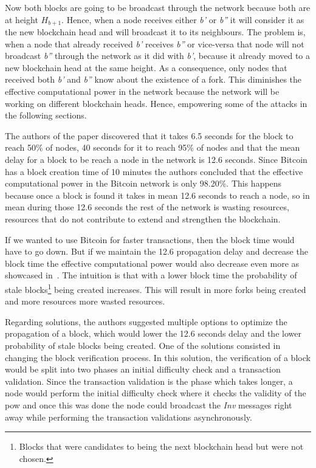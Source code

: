 Now both blocks are going to be broadcast through the network because both are at height $H_{b+1}$. Hence, when a node receives either \textit{b'} or \textit{b''} it will consider it as the new blockchain head and will broadcast it to its neighbours. The problem is, when a node that already received \textit{b'} receives \textit{b''} or vice-versa that node will not broadcast \textit{b''} through the network as it did with \textit{b'}, because it already moved to a new blockchain head at the same height. As a consequence, only nodes that received both \textit{b'} and \textit{b''} know about the existence of a fork. This diminishes the effective computational power in the network because the network will be working on different blockchain heads. Hence, empowering some of the attacks in the following sections.

The authors of the paper discovered that it takes 6.5 seconds for the block to reach 50\% of nodes, 40 seconds for it to reach 95\% of nodes and that the mean delay for a block to be reach a node in the network is 12.6 seconds. Since Bitcoin has a block creation time of 10 minutes the authors concluded that the effective computational power in the Bitcoin network is only 98.20\%. This happens because once a block is found it takes in mean 12.6 seconds to reach a node, so in mean during those 12.6 seconds the rest of the network is wasting resources, resources that do not contribute to extend and strengthen the blockchain.

If we wanted to use Bitcoin for faster transactions, then the block time would have to go down. But if we maintain the 12.6 propagation delay and decrease the block time the effective computational power would also decrease even more as showcased in~\cite{ethereumblog}. The intuition is that with a lower block time the probability of stale blocks\footnote{Blocks that were candidates to being the next blockchain head but were not chosen.} being created increases. This will result in more forks being created and more resources more wasted resources.

Regarding solutions, the authors suggested multiple options to optimize the propagation of a block, which would lower the 12.6 seconds delay and the lower probability of stale blocks being created. One of the solutions consisted in changing the block verification process. In this solution, the verification of a block would be split into two phases an initial difficulty check and a transaction validation. Since the transaction validation is the phase which takes longer, a node would perform the initial difficulty check where it checks the validity of the \acrshort{pow} and once this was done the node could broadcast the \textit{Inv} messages right away while performing the transaction validations asynchronously.

